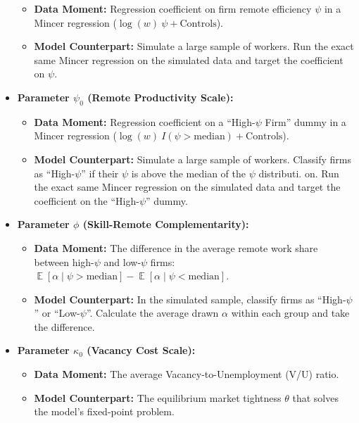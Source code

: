 \documentclass[
  11pt,
  letterpaper,
  DIV=11,
  numbers=noendperiod]{scrartcl}
\providecommand{\tightlist}{%
  \setlength{\itemsep}{0pt}\setlength{\parskip}{0pt}}\usepackage{longtable,booktabs,array}
\DeclareMathOperator*{\Exp}{\mathbb{E}} %
\begin{document}
\begin{itemize}
  \begin{itemize}
  \tightlist
  \item
    \textbf{Data Moment:} Regression coefficient on firm remote
    efficiency \(\psi\) in a Mincer regression
    (\(\log(w) ~ \psi + \text{Controls}\)).
  \item
    \textbf{Model Counterpart:} Simulate a large sample of workers. Run
    the exact same Mincer regression on the simulated data and target
    the coefficient on \(\psi\).
  \end{itemize}
\item
  \textbf{Parameter \(\psi_{0}\) (Remote Productivity Scale):}

  \begin{itemize}
  \tightlist
  \item
    \textbf{Data Moment:} Regression coefficient on a ``High-\(\psi\)
    Firm'' dummy in a Mincer regression
    (\(\log(w) ~ I(\psi > \text{median}) + \text{Controls}\)).
  \item
    \textbf{Model Counterpart:} Simulate a large sample of workers.
    Classify firms as ``High-\(\psi\)'' if their \(\psi\) is above the
    median of the \(\psi\) distributi. on. Run the exact same Mincer
    regression on the simulated data and target the coefficient on the
    ``High-\(\psi\)'' dummy.
  \end{itemize}
\item
  \textbf{Parameter \(\phi\) (Skill-Remote Complementarity):}

  \begin{itemize}
  \tightlist
  \item
    \textbf{Data Moment:} The difference in the average remote work
    share between high-\(\psi\) and low-\(\psi\) firms:
    \(\Exp[\alpha \mid \psi > \text{median}] - \Exp[\alpha \mid \psi < \text{median}]\).
  \item
    \textbf{Model Counterpart:} In the simulated sample, classify firms
    as ``High-\(\psi\)'' or ``Low-\(\psi\)''. Calculate the average
    drawn \(\alpha\) within each group and take the difference.
  \end{itemize}
\item
  \textbf{Parameter \(\kappa_0\) (Vacancy Cost Scale):}

  \begin{itemize}
  \tightlist
  \item
    \textbf{Data Moment:} The average Vacancy-to-Unemployment (V/U)
    ratio.
  \item
    \textbf{Model Counterpart:} The equilibrium market tightness
    \(\theta\) that solves the model's fixed-point problem.
  \end{itemize}
\end{itemize}
\end{document}
